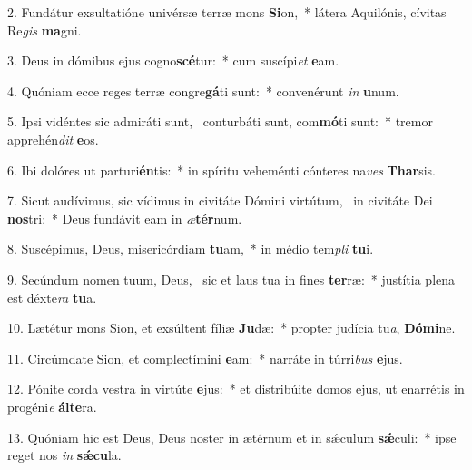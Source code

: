 2. Fundátur exsultatióne univérsæ terræ mons \textbf{Si}on,~*  látera Aquilónis, cívitas Re\textit{gis} \textbf{ma}gni.\

3. Deus in dómibus ejus cogno\textbf{scé}tur:~*  cum suscípi\textit{et} \textbf{e}am.\

4. Quóniam ecce reges terræ congre\textbf{gá}ti sunt:~*  convenérunt \textit{in} \textbf{u}num.\

5. Ipsi vidéntes sic admiráti sunt, \dag\  conturbáti sunt, com\textbf{mó}ti sunt:~*  tremor apprehén\textit{dit} \textbf{e}os.\

6. Ibi dolóres ut parturi\textbf{én}tis:~*  in spíritu veheménti cónteres na\textit{ves} \textbf{Thar}sis.\

7. Sicut audívimus, sic vídimus in civitáte Dómini virtútum, \dag\  in civitáte Dei \textbf{nos}tri:~*  Deus fundávit eam in \textit{æ}\textbf{tér}num.\

8. Suscépimus, Deus, misericórdiam \textbf{tu}am,~*  in médio tem\textit{pli} \textbf{tu}i.\

9. Secúndum nomen tuum, Deus, \dag\  sic et laus tua in fines \textbf{ter}ræ:~*  justítia plena est déxte\textit{ra} \textbf{tu}a.\

10. Lætétur mons Sion, et exsúltent fíliæ \textbf{Ju}dæ:~*  propter judícia tu\textit{a}, \textbf{Dó}\textbf{mi}ne.\

11. Circúmdate Sion, et complectímini \textbf{e}am:~*  narráte in túrri\textit{bus} \textbf{e}jus.\

12. Pónite corda vestra in virtúte \textbf{e}jus:~*  et distribúite domos ejus, ut enarrétis in progéni\textit{e} \textbf{ál}\textbf{te}ra.\

13. Quóniam hic est Deus, Deus noster in ætérnum et in sǽculum \textbf{sǽ}culi:~*  ipse reget nos \textit{in} \textbf{sǽ}\textbf{cu}la.\

